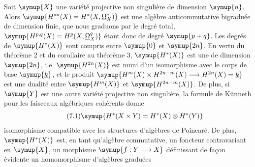 Soit $\symup{X}$ une variété projective non singulière de dimension $\symup{n}$. Alors
$\symup{H^{**}(X)=H^{*}(X,\underline{\Omega}_X^{*})}$ est une algèbre anticommutative bigraduée de dimension finie, que nous graduons
par le degré total, $\symup{H^{p,q}(X)=H^{p}(X,\underline{\Omega}_X^{q})}$ étant donc de degré
$\symup{p+q}$. Les degrés de $\symup{H^{*}(X)}$ sont compris entre $\symup{0}$ et $\symup{2n}$. En vertu du
théorème 2 et du corollaire au théorème 3, $\symup{H^{*}(X)}$ est une  de dimension $\symup{2n}$, i.e. $\symup{H^{2n}(X)}$ est muni d'un isomorphisme avec
le corps de base $\symup{\underline{k}}$, et le produit
$\symup{H^{m}(X)\times H^{2n-m}(X)\longrightarrow H^{2n}(X)=\underline{k}}$ est une dualité entre $\symup{H^{m}(X)}$ et $\symup{H^{2n-m}(X)}$. De plus, si $\symup{Y}$ est une
autre variété projective non singulière, la formule de Künneth pour les
faisceaux algébriques cohérents donne
\begin{equation}\tag{7.1}
  \symup{H^{*}(X\times Y)=H^{*}(X)\otimes H^{*}(Y)}
\end{equation}
isomorphisme compatible avec les structures d'algèbres de Poincaré. De plus,
$\symup{H^{*}(X)}$ est, en tant qu'algèbre commutative, un foncteur contravariant en
$\symup{X}$, un morphisme $\symup{f:Y\longrightarrow X}$ définissant de façon évidente un
homomorphisme d'algèbres graduées

